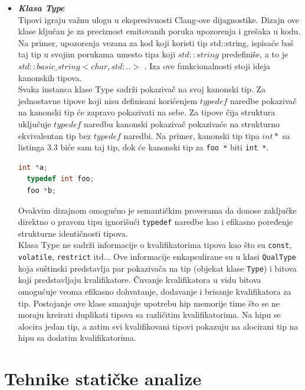 \documentclass[12pt,oneside]{memoir}
\begin{document}
\begin{itemize}
  \item \textit{\textbf{Klasa Type}} \\ Tipovi igraju va\v{z}nu ulogu u ekspresivnosti Clang-ove dijagnostike. Dizajn ove klase klju\v{c}an je za preciznost emitovanih poruka upozorenja i gre\v{s}aka u kodu. Na primer, upozorenja vezana za kod koji koristi tip std::string, ispisa\'{c}e ba\v{s} taj tip u svojim porukama umesto tipa koji $std::string$ predefini\v{s}e, a to je $std::basic\_string<char, std:.. >$ . Iza ove funkcionalnosti stoji ideja kanonskih tipova.
  \\
  \indent
  Svaka instanca klase Type sadr\v{z}i pokaziva\v{c} na svoj kanonski tip. Za jednostavne tipove koji nisu definisani kori\'{c}enjem $typedef$ naredbe pokaziva\v{c} na kanonski tip \'{c}e zapravo pokazivati na sebe. Za tipove \v{c}ija struktura uklju\v{c}uje $typedef$ naredbu kanonski pokaziva\v{c} pokaziva\'{c}e na strukturno ekvivalentan tip bez $typedef$ naredbi.
  Na primer, kanonski tip tipa $int *$ sa listinga 3.3 bi\'{c}e sam taj tip, dok \'{c}e kanonski tip za \texttt{foo *} biti \texttt{int *}.
\begin{lstlisting}[caption={Demonstracija kanonskih tipova},label={lst:label},language=C++, captionpos=b]
  int *a;
  typedef int foo;
  foo *b;
\end{lstlisting}
  Ovakvim dizajnom omogu\'{c}no je semanti\v{c}kim proverama da donose zaklju\v{c}ke direktno o pravom tipu ignori\v{s}u\'{c}i \texttt{typedef} naredbe kao i efikasno poređenje strukturne identi\v{c}nosti tipova.
  \def\code#1{\texttt{#1}}
  \\
  \indent
  Klasa Type ne sadr\v{z}i informacije o kvalifikatorima tipova kao \v{s}to su \code{const}, \code{volatile}, \code{restrict} itd... Ove informacije enkapsulirane su u klasi \code{QualType} koja su\v{s}tinski predstavlja par pokaziva\v{c}a na tip (objekat klase \code{Type}) i bitova koji predstavljaju
  kvalifikatore. \v{C}uvanje kvalifikatora u vidu bitova omogu\'{c}uje veoma efikasno dohvatanje, dodavanje i brisanje kvalifikatora za tip. Postojanje ove klase smanjuje upotrebu hip memorije time \v{s}to se ne moraju kreirati duplikati tipova sa razli\v{c}itim kvalifikatorima. Na hipu se alocira jedan tip, a zatim 
  svi kvalifikovani tipovi pokazuju na alocirani tip na hipu sa dodatim kvalifikatorima.
\end{itemize}

\section{Tehnike stati\v{c}ke analize}
\end{document}
